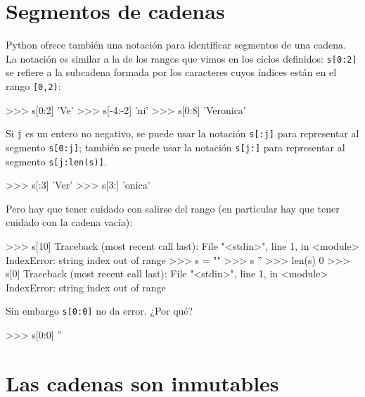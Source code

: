 
\section{Segmentos de cadenas}

Python ofrece también una notación para identificar segmentos de una
cadena. La notación es similar a la de los rangos que vimos en los ciclos
definidos: \lstinline+s[0:2]+ se refiere a la subcadena formada por los
caracteres cuyos índices están en el rango \lstinline+[0,2)+:

\begin{codigo-python-sn}
>>> s[0:2]
'Ve'
>>> s[-4:-2]
'ni'
>>> s[0:8]
'Veronica'
\end{codigo-python-sn}

Si \lstinline!j! es un entero no negativo, se puede usar la notación
\lstinline+s[:j]+ para representar al segmento \lstinline+s[0:j]+; también
se puede usar la notación \lstinline+s[j:]+ para representar al segmento
\lstinline+s[j:len(s)]+.

\begin{codigo-python-sn}
>>> s[:3]
'Ver'
>>> s[3:]
'onica'
\end{codigo-python-sn}

Pero hay que tener cuidado con salirse del rango (en particular hay que
tener cuidado con la cadena vacía):

\begin{codigo-python-sn}
>>> s[10]
Traceback (most recent call last):
  File "<stdin>", line 1, in <module>
IndexError: string index out of range
>>> s = ""
>>> s
''
>>> len(s)
0
>>> s[0]
Traceback (most recent call last):
  File "<stdin>", line 1, in <module>
IndexError: string index out of range
\end{codigo-python-sn}

Sin embargo \lstinline+s[0:0]+ no da error. ¿Por qué?

\begin{codigo-python-sn}
>>> s[0:0]
''
\end{codigo-python-sn}



\section{Las cadenas son inmutables}

